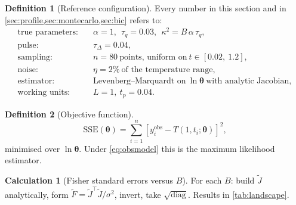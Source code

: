 \documentclass[11pt,a4paper]{article}
\theoremstyle{definition}
\newtheorem{definitionx}{Definition}[section]
\newtheorem{calculationx}{Calculation}[section]
\newcommand{\tq}{\tau_{q}}
\newcommand{\kk}{\kappa^{2}}
\newcommand{\Bnum}{B}
\begin{document}
\begin{definitionx}[Reference configuration]
\label{def:config}
Every number in this section and in \cref{sec:profile,sec:montecarlo,sec:bic}
refers to:
\begin{align}
  \text{true parameters:}&\quad \alpha=1,\ \ \tq=0.03,\ \
     \kk=\Bnum\,\alpha\,\tq ,
  \label{eq:cfg-1}\\
  \text{pulse:}&\quad \tau_{\Delta}=0.04 ,
  \label{eq:cfg-2}\\
  \text{sampling:}&\quad n=80 \ \text{points, uniform on}\
     t\in[0.02,\ 1.2] ,
  \label{eq:cfg-3}\\
  \text{noise:}&\quad \eta = 2\% \ \text{of the temperature range} ,
  \label{eq:cfg-4}\\
  \text{estimator:}&\quad \text{Levenberg--Marquardt on}\ \ln\bm{\theta}\
     \text{with analytic Jacobian} ,
  \label{eq:cfg-5}\\
  \text{working units:}&\quad L=1,\ t_{p}=0.04 .
  \label{eq:cfg-6}
\end{align}
\end{definitionx}

\begin{definitionx}[Objective function]
\label{def:objective}
\begin{equation}
  \mathrm{SSE}(\bm{\theta})
   = \sum_{i=1}^{n}
     \left[y_{i}^{\text{obs}} - T(1,t_{i};\bm{\theta})\right]^{2} ,
  \label{eq:sse}
\end{equation}
minimised over $\ln\bm{\theta}$. Under \eqref{eq:obsmodel} this is the maximum
likelihood estimator.
\end{definitionx}

\begin{calculationx}[Fisher standard errors versus $\Bnum$]
\label{calc:landscape}
For each $\Bnum$: build $\tilde J$ analytically, form
$\tilde F=\tilde J^{\!\top}\tilde J/\sigma^{2}$, invert, take
$\sqrt{\operatorname{diag}}$. Results in \cref{tab:landscape}.
\end{calculationx}
\end{document}
